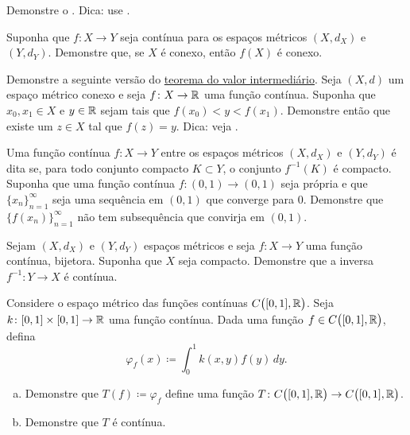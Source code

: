 \begin{exercise}
Demonstre o . Dica: use .
\end{exercise}

\begin{exercise} \label{exercise:msconnconn}
Suponha que $f \colon X \to Y$ seja contínua para os espaços métricos $(X,d_X)$
e $(Y,d_Y)$. Demonstre que, se $X$ é conexo, então $f(X)$ é conexo.
\end{exercise}

\begin{exercise}
Demonstre a seguinte versão do
\hyperref[IVT:thm]{teorema do valor intermediário}. Seja $(X,d)$ um espaço métrico
conexo e seja $f \colon X \to {\mathbb{R}}$ uma função contínua. Suponha que
$x_0,x_1 \in X$ e $y \in {\mathbb{R}}$ sejam tais que $f(x_0) < y < f(x_1)$.
Demonstre então que existe um $z \in X$ tal que $f(z) = y$.
Dica: veja .
\end{exercise}

\begin{exercise}
Uma função contínua $f \colon X \to Y$ entre os espaços métricos $(X,d_X)$ e
$(Y,d_Y)$ é dita \emph{}
se, para todo conjunto compacto $K \subset Y$, o conjunto $f^{-1}(K)$ é compacto.
Suponha que uma função contínua $f \colon (0,1) \to (0,1)$ seja própria e que
$\{ x_n \}_{n=1}^\infty$ seja uma sequência em $(0,1)$ que converge para $0$. Demonstre que
$\bigl\{ f(x_n) \bigr\}_{n=1}^\infty$ não tem subsequência que
convirja em $(0,1)$.
\end{exercise}

\begin{exercise}
Sejam $(X,d_X)$ e $(Y,d_Y)$ espaços métricos e seja
$f \colon X \to Y$ uma função contínua, bijetora. Suponha
que $X$ seja compacto. Demonstre que a inversa $f^{-1} \colon Y \to X$
é contínua.
\end{exercise}

\begin{exercise}
Considere o espaço métrico das funções contínuas $C\bigl([0,1],{\mathbb{R}}\bigr)$.
Seja
$k \colon [0,1] \times [0,1] \to {\mathbb{R}}$ uma função contínua.
Dada uma função $f \in C\bigl([0,1],{\mathbb{R}}\bigr)$, defina
\begin{equation*}
\varphi_f(x) \coloneqq \int_0^1 k(x,y) f(y) \,dy .
\end{equation*}
\begin{enumerate}[a)]
\item
Demonstre que $T(f) \coloneqq \varphi_f$ define uma função
$T \colon C\bigl([0,1],{\mathbb{R}}\bigr) \to C\bigl([0,1],{\mathbb{R}}\bigr)$.
\item
Demonstre que $T$ é contínua.
\end{enumerate}
\end{exercise}

